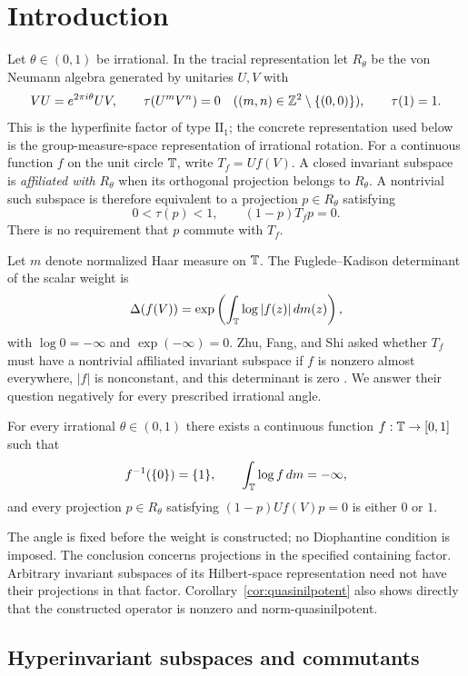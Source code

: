\section{Introduction}\label{sec:introduction}

Let $\theta\in(0,1)$ be irrational.  In the tracial representation let
$R_\theta$ be the von Neumann algebra generated by unitaries $U,V$ with
\[
 VU=e^{2\pi i\theta}UV,\qquad
 \tau(U^mV^n)=0\quad((m,n)\in\mathbb Z^2\setminus\{(0,0)\}),\qquad\tau(1)=1.
\]
This is the hyperfinite factor of type $\mathrm{II}_1$; the concrete
representation used below is the group-measure-space representation of
irrational rotation.  For a continuous function $f$ on the unit circle
$\mathbb T$, write $T_f=Uf(V)$.  A closed invariant subspace is
\emph{affiliated with $R_\theta$} when its orthogonal projection belongs
to $R_\theta$.  A nontrivial such subspace is therefore equivalent to
a projection $p\in R_\theta$ satisfying
\[
 0<\tau(p)<1,\qquad (1-p)T_fp=0.
\]
There is no requirement that $p$ commute with $T_f$.

Let $m$ denote normalized Haar measure on $\mathbb T$.  The
Fuglede--Kadison determinant of the scalar weight is
\[
 \Delta(f(V))=\exp\left(\int_\mathbb T\log|f(z)|\,dm(z)\right),
\]
with $\log0=-\infty$ and $\exp(-\infty)=0$.
Zhu, Fang, and Shi asked whether $T_f$ must have a nontrivial affiliated
invariant subspace if $f$ is nonzero almost everywhere, $|f|$ is
nonconstant, and this determinant is zero
\citep[p.~264, Question after Proposition~5.7]{zfs}.
We answer their question negatively for every prescribed irrational angle.

\begin{theorem}\label{thm:main}
For every irrational $\theta\in(0,1)$ there exists a continuous function
$f:\mathbb T\to[0,1]$ such that
\[
 f^{-1}(\{0\})=\{1\},\qquad \int_\mathbb T\log f\,dm=-\infty,
\]
and every projection $p\in R_\theta$ satisfying $(1-p)Uf(V)p=0$
is either $0$ or $1$.
\end{theorem}

The angle is fixed before the weight is constructed; no Diophantine
condition is imposed.  The conclusion concerns projections in the
specified containing factor.  Arbitrary invariant subspaces of its
Hilbert-space representation need not have their projections in that
factor.  Corollary~\ref{cor:quasinilpotent} also shows directly that the
constructed operator is nonzero and norm-quasinilpotent.

\subsection{Hyperinvariant subspaces and commutants}

